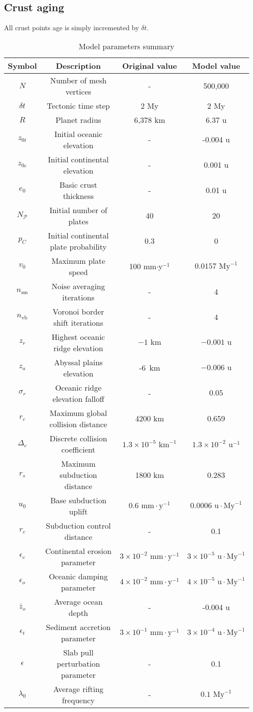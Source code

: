 \subsection{Crust aging}
All crust points age is simply incremented by $\delta t$.
\begin{table}[h]
\centering
\begin{tabular}{cccc}
\textbf{Symbol}&\textbf{Description}&\textbf{Original value}&\textbf{Model value}\\
\hline
$N$&Number of mesh vertices&-&500,000\\
$\delta t$&Tectonic time step&2 My&2 My\\
$R$&Planet radius&6,378 km&6.37 u\\
$z_{0t}$&Initial oceanic elevation&-&-0.004 u\\
$z_{0c}$&Initial continental elevation&-&0.001 u\\
$e_0$&Basic crust thickness&-&0.01 u\\
$N_\mathcal{P}$&Initial number of plates&40&20\\
$p_C$&Initial continental plate probability&0.3&0\\
$v_0$&Maximum plate speed&100 mm$\cdot$y$^{-1}$&$0.0157\mbox{ My}^{-1}$\\
$n_{\mbox{sm}}$&Noise averaging iterations&-&4\\
$n_{\mbox{vb}}$&Voronoi border shift iterations&-&4\\
$z_r$&Highest oceanic ridge elevation&$-1\mbox{ km}$&$-0.001\mbox{ u}$\\
$z_a$&Abyssal plains elevation&-6\mbox{ km}&$-0.006\mbox{ u}$\\
$\sigma_r$&Oceanic ridge elevation falloff&-&$0.05$\\
$r_c$&Maximum global collision distance&4200 km&0.659\\
$\Delta_c$&Discrete collision coefficient&$1.3\times10^{-5}\mbox{ km}^{-1}$&$1.3\times10^{-2}\mbox{ u}^{-1}$\\
$r_s$&Maximum subduction distance&1800 km&0.283\\
$u_0$&Base subduction uplift&$0.6\mbox{ mm}\cdot\mbox{y}^{-1}$&$0.0006\mbox{ u}\cdot\mbox{My}^{-1}$\\
$r_c$&Subduction control distance&-&0.1\\
$\epsilon_c$&Continental erosion parameter&$3\times10^{-2}\mbox{ mm}\cdot\mbox{y}^{-1}$&$3\times10^{-5}\mbox{ u}\cdot\mbox{My}^{-1}$\\
$\epsilon_o$&Oceanic damping parameter&$4\times10^{-2}\mbox{ mm}\cdot\mbox{y}^{-1}$&$4\times10^{-5}\mbox{ u}\cdot\mbox{My}^{-1}$\\
$\bar{z}_o$&Average ocean depth&-&-0.004 u\\
$\epsilon_t$&Sediment accretion parameter&$3\times10^{-1}\mbox{ mm}\cdot\mbox{y}^{-1}$&$3\times10^{-4}\mbox{ u}\cdot\mbox{My}^{-1}$\\
$\epsilon$&Slab pull perturbation parameter&-&0.1\\
$\lambda_0$&Average rifting frequency&-&$0.1\mbox{ My}^{-1}$\\
\end{tabular}
\caption{Model parameters summary}
\label{tab:model-parameters-summary}
\end{table}